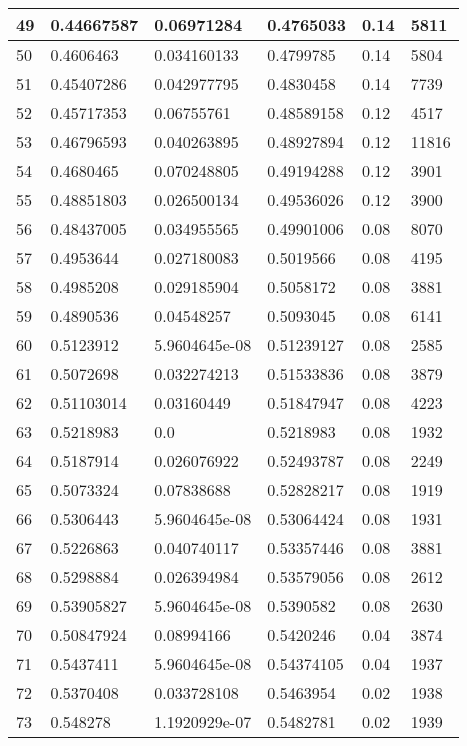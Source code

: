 \begin{longtable}{|l|l|l|l|l|l|}
49 & 0.44667587 & 0.06971284 & 0.4765033 & 0.14 & 5811 \\ \hline 
50 & 0.4606463 & 0.034160133 & 0.4799785 & 0.14 & 5804 \\ \hline 
51 & 0.45407286 & 0.042977795 & 0.4830458 & 0.14 & 7739 \\ \hline 
52 & 0.45717353 & 0.06755761 & 0.48589158 & 0.12 & 4517 \\ \hline 
53 & 0.46796593 & 0.040263895 & 0.48927894 & 0.12 & 11816 \\ \hline 
54 & 0.4680465 & 0.070248805 & 0.49194288 & 0.12 & 3901 \\ \hline 
55 & 0.48851803 & 0.026500134 & 0.49536026 & 0.12 & 3900 \\ \hline 
56 & 0.48437005 & 0.034955565 & 0.49901006 & 0.08 & 8070 \\ \hline 
57 & 0.4953644 & 0.027180083 & 0.5019566 & 0.08 & 4195 \\ \hline 
58 & 0.4985208 & 0.029185904 & 0.5058172 & 0.08 & 3881 \\ \hline 
59 & 0.4890536 & 0.04548257 & 0.5093045 & 0.08 & 6141 \\ \hline 
60 & 0.5123912 & 5.9604645e-08 & 0.51239127 & 0.08 & 2585 \\ \hline 
61 & 0.5072698 & 0.032274213 & 0.51533836 & 0.08 & 3879 \\ \hline 
62 & 0.51103014 & 0.03160449 & 0.51847947 & 0.08 & 4223 \\ \hline 
63 & 0.5218983 & 0.0 & 0.5218983 & 0.08 & 1932 \\ \hline 
64 & 0.5187914 & 0.026076922 & 0.52493787 & 0.08 & 2249 \\ \hline 
65 & 0.5073324 & 0.07838688 & 0.52828217 & 0.08 & 1919 \\ \hline 
66 & 0.5306443 & 5.9604645e-08 & 0.53064424 & 0.08 & 1931 \\ \hline 
67 & 0.5226863 & 0.040740117 & 0.53357446 & 0.08 & 3881 \\ \hline 
68 & 0.5298884 & 0.026394984 & 0.53579056 & 0.08 & 2612 \\ \hline 
69 & 0.53905827 & 5.9604645e-08 & 0.5390582 & 0.08 & 2630 \\ \hline 
70 & 0.50847924 & 0.08994166 & 0.5420246 & 0.04 & 3874 \\ \hline 
71 & 0.5437411 & 5.9604645e-08 & 0.54374105 & 0.04 & 1937 \\ \hline 
72 & 0.5370408 & 0.033728108 & 0.5463954 & 0.02 & 1938 \\ \hline 
73 & 0.548278 & 1.1920929e-07 & 0.5482781 & 0.02 & 1939 \\ \hline 

\end{longtable}
